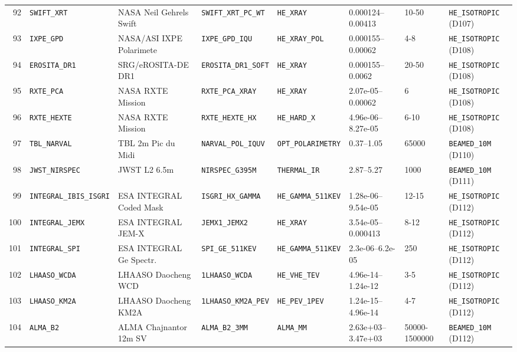 \documentclass[twocolumn,10pt]{article}
\begin{document}
\begin{table}[!ht]
{\begin{tabular}{rlllllll}
92 & \texttt{SWIFT\_XRT} & NASA Neil Gehrels Swift & \texttt{SWIFT\_XRT\_PC\_WT} & \texttt{HE\_XRAY} & 0.000124--0.00413 & 10-50 & \texttt{HE\_ISOTROPIC} (D107) \\
93 & \texttt{IXPE\_GPD} & NASA/ASI IXPE Polarimete & \texttt{IXPE\_GPD\_IQU} & \texttt{HE\_XRAY\_POL} & 0.000155--0.00062 & 4-8 & \texttt{HE\_ISOTROPIC} (D108) \\
94 & \texttt{EROSITA\_DR1} & SRG/eROSITA-DE DR1 & \texttt{EROSITA\_DR1\_SOFT} & \texttt{HE\_XRAY} & 0.000155--0.0062 & 20-50 & \texttt{HE\_ISOTROPIC} (D108) \\
95 & \texttt{RXTE\_PCA} & NASA RXTE Mission & \texttt{RXTE\_PCA\_XRAY} & \texttt{HE\_XRAY} & 2.07e-05--0.00062 & 6 & \texttt{HE\_ISOTROPIC} (D108) \\
96 & \texttt{RXTE\_HEXTE} & NASA RXTE Mission & \texttt{RXTE\_HEXTE\_HX} & \texttt{HE\_HARD\_X} & 4.96e-06--8.27e-05 & 6-10 & \texttt{HE\_ISOTROPIC} (D108) \\
97 & \texttt{TBL\_NARVAL} & TBL 2m Pic du Midi & \texttt{NARVAL\_POL\_IQUV} & \texttt{OPT\_POLARIMETRY} & 0.37--1.05 & 65000 & \texttt{BEAMED\_10M} (D110) \\
98 & \texttt{JWST\_NIRSPEC} & JWST L2 6.5m & \texttt{NIRSPEC\_G395M} & \texttt{THERMAL\_IR} & 2.87--5.27 & 1000 & \texttt{BEAMED\_10M} (D111) \\
99 & \texttt{INTEGRAL\_IBIS\_ISGRI} & ESA INTEGRAL Coded Mask & \texttt{ISGRI\_HX\_GAMMA} & \texttt{HE\_GAMMA\_511KEV} & 1.28e-06--9.54e-05 & 12-15 & \texttt{HE\_ISOTROPIC} (D112) \\
100 & \texttt{INTEGRAL\_JEMX} & ESA INTEGRAL JEM-X & \texttt{JEMX1\_JEMX2} & \texttt{HE\_XRAY} & 3.54e-05--0.000413 & 8-12 & \texttt{HE\_ISOTROPIC} (D112) \\
101 & \texttt{INTEGRAL\_SPI} & ESA INTEGRAL Ge Spectr. & \texttt{SPI\_GE\_511KEV} & \texttt{HE\_GAMMA\_511KEV} & 2.3e-06--6.2e-05 & 250 & \texttt{HE\_ISOTROPIC} (D112) \\
102 & \texttt{LHAASO\_WCDA} & LHAASO Daocheng WCD & \texttt{1LHAASO\_WCDA} & \texttt{HE\_VHE\_TEV} & 4.96e-14--1.24e-12 & 3-5 & \texttt{HE\_ISOTROPIC} (D112) \\
103 & \texttt{LHAASO\_KM2A} & LHAASO Daocheng KM2A & \texttt{1LHAASO\_KM2A\_PEV} & \texttt{HE\_PEV\_1PEV} & 1.24e-15--4.96e-14 & 4-7 & \texttt{HE\_ISOTROPIC} (D112) \\
104 & \texttt{ALMA\_B2} & ALMA Chajnantor 12m SV & \texttt{ALMA\_B2\_3MM} & \texttt{ALMA\_MM} & 2.63e+03--3.47e+03 & 50000-1500000 & \texttt{BEAMED\_10M} (D112) \\
\bottomrule
\end{tabular}%
}
\end{table}
\clearpage
\end{document}
